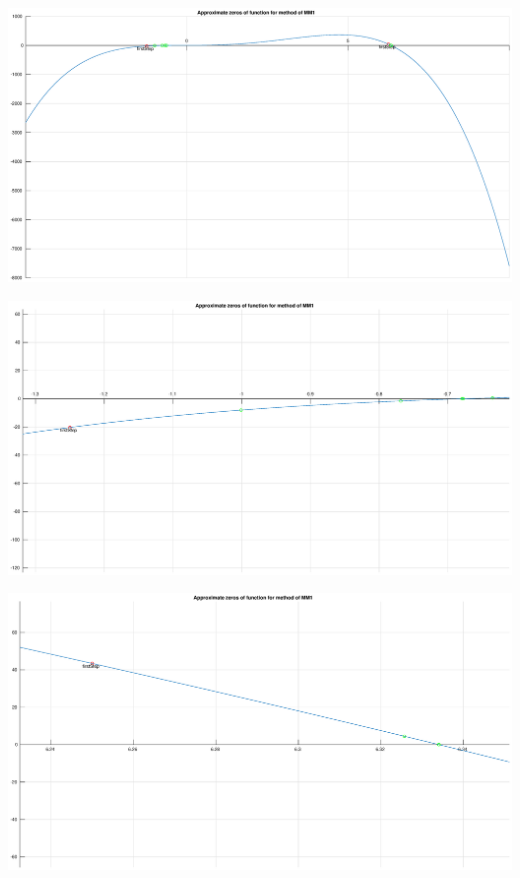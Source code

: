 \documentclass[12pt]{report}
\begin{document}
\begin{center}
   \includegraphics[scale=0.25]{task2mm1overall.eps}
\end{center}

\begin{center}
   \includegraphics[scale=0.25]{task2mm1zommedleft.eps}
\end{center}

\begin{center}
   \includegraphics[scale=0.25]{task2mm1zommedright.eps}
\end{center}
\end{document}
